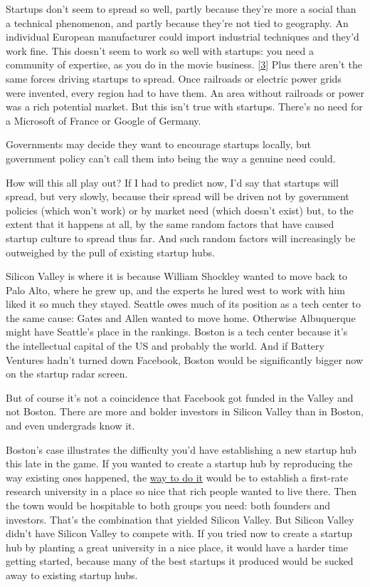 Startups don't seem to spread so well, partly because they're more a
social than a technical phenomenon, and partly because they're not tied
to geography. An individual European manufacturer could import
industrial techniques and they'd work fine. This doesn't seem to work so
well with startups: you need a community of expertise, as you do in the
movie business. {[}\hyperref[f3n]{3}{]} Plus there aren't the same
forces driving startups to spread. Once railroads or electric power
grids were invented, every region had to have them. An area without
railroads or power was a rich potential market. But this isn't true with
startups. There's no need for a Microsoft of France or Google of
Germany.

Governments may decide they want to encourage startups locally, but
government policy can't call them into being the way a genuine need
could.

How will this all play out? If I had to predict now, I'd say that
startups will spread, but very slowly, because their spread will be
driven not by government policies (which won't work) or by market need
(which doesn't exist) but, to the extent that it happens at all, by the
same random factors that have caused startup culture to spread thus far.
And such random factors will increasingly be outweighed by the pull of
existing startup hubs.

Silicon Valley is where it is because William Shockley wanted to move
back to Palo Alto, where he grew up, and the experts he lured west to
work with him liked it so much they stayed. Seattle owes much of its
position as a tech center to the same cause: Gates and Allen wanted to
move home. Otherwise Albuquerque might have Seattle's place in the
rankings. Boston is a tech center because it's the intellectual capital
of the US and probably the world. And if Battery Ventures hadn't turned
down Facebook, Boston would be significantly bigger now on the startup
radar screen.

But of course it's not a coincidence that Facebook got funded in the
Valley and not Boston. There are more and bolder investors in Silicon
Valley than in Boston, and even undergrads know it.

Boston's case illustrates the difficulty you'd have establishing a new
startup hub this late in the game. If you wanted to create a startup hub
by reproducing the way existing ones happened, the
\href{siliconvalley.html}{way to do it} would be to establish a
first-rate research university in a place so nice that rich people
wanted to live there. Then the town would be hospitable to both groups
you need: both founders and investors. That's the combination that
yielded Silicon Valley. But Silicon Valley didn't have Silicon Valley to
compete with. If you tried now to create a startup hub by planting a
great university in a nice place, it would have a harder time getting
started, because many of the best startups it produced would be sucked
away to existing startup hubs.

